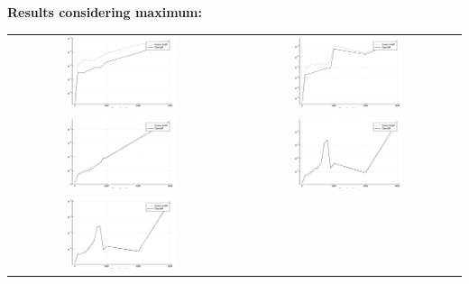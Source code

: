\documentclass[a4paper,11pt]{article}
\begin{document}
\newpage
\bf{Results considering maximum:}\\

\begin{tabular}{cc}
	\includegraphics[width=0.5\textwidth]{perf_maximum_3} & 
	\includegraphics[width=0.5\textwidth]{perf_maximum_10} \\
	\includegraphics[width=0.5\textwidth]{perf_maximum_100} &
	\includegraphics[width=0.5\textwidth]{perf_maximum_500} \\
	\includegraphics[width=0.5\textwidth]{perf_maximum_1000} &
\end{tabular}
\end{document}
